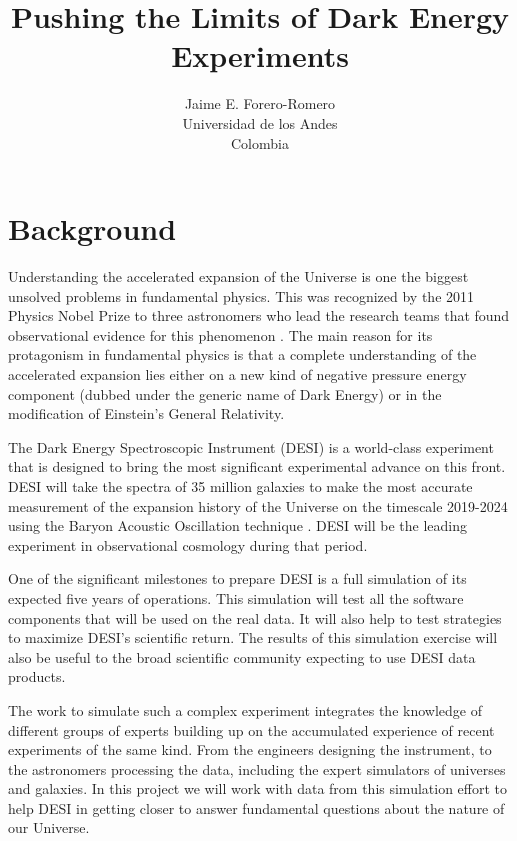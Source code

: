 \documentclass[12pt]{article}
\title{Pushing the Limits of Dark Energy Experiments}
\author{Jaime E. Forero-Romero\\Universidad de los Andes\\Colombia}
\begin{document}
\maketitle
\pagestyle{empty}
\pagestyle{fancy}
\section*{Background}

Understanding the accelerated expansion of the Universe is one the
biggest unsolved problems in fundamental physics.  
This was recognized by the 2011 Physics Nobel Prize to three
astronomers who lead the research teams that found observational evidence for
this phenomenon \cite{1998AJ....116.1009R,1999ApJ...517..565P}.  
The main reason for its protagonism in fundamental physics is that a
complete understanding of the accelerated expansion lies either on a
new kind of negative pressure energy component (dubbed under the
generic name of Dark Energy) or in the modification of Einstein's
General Relativity.   

The Dark Energy Spectroscopic Instrument (DESI) is a world-class
experiment that is designed to bring the most significant experimental
advance on this front. 
DESI will take the spectra of 35 million galaxies to make the most
accurate measurement of the expansion history of the Universe on the
timescale 2019-2024 using the Baryon Acoustic Oscillation technique
\cite{2005ApJ...633..560E,2005MNRAS.362..505C}.    
DESI will be the leading experiment in observational cosmology during
that period.  

One of the significant milestones to prepare DESI is a full simulation
of its expected five years of operations. 
This simulation will test all the software components that will be used on
the real data. It will also help to test strategies to  maximize
DESI's scientific return.   
The results of this simulation exercise will also be useful to the
broad scientific community expecting to use DESI data products. 
 
The work to simulate such a complex experiment integrates the knowledge of
different groups of experts \cite{2016A&C....15....1N} building up on
the accumulated experience of recent experiments of the same
kind\cite{2013AJ....145...10D}.  
From the engineers designing   the instrument, to the astronomers
processing the data, including the expert simulators of universes and
galaxies. 
In this project we will work with data from this simulation effort to
help DESI in getting closer to answer fundamental questions about
the nature of our Universe.  
\end{document}
